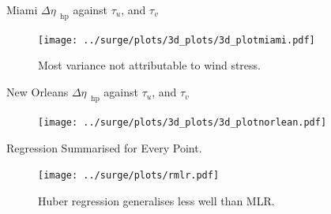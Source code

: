 \documentclass[usenames, dvipsnames]{beamer}
\begin{document}
\begin{frame}{Miami $\Delta\eta_{\;\;\mathrm{hp}}$ against $\tau_u$, and $\tau_v$}
\vspace{-30pt}
\hspace{-30pt}
 \begin{minipage}{1.1\textwidth}

\begin{figure}[htb!]
    \centering
   \hspace{-40pt} \texttt{[image: ../surge/plots/3d\_plots/3d\_plotmiami.pdf]}
    \vspace{-15pt}
    \caption{Most variance not attributable to wind stress.}
    \label{fig:A}
\end{figure}
\end{minipage}
\end{frame}


\begin{frame}{New Orleans $\Delta\eta_{\;\;\mathrm{hp}}$ against $\tau_u$, and $\tau_v$}
\vspace{-30pt}
\hspace{-30pt}
 \begin{minipage}{1.1\textwidth}
\begin{figure}[htb!]
    \centering
   \hspace{-40pt} \texttt{[image: ../surge/plots/3d\_plots/3d\_plotnorlean.pdf]}
    \vspace{-15pt}
    \label{fig:A}
\end{figure}
\end{minipage}
\end{frame}


\begin{frame}{Regression Summarised for Every Point.}
\vspace{-30pt}
\hspace{-30pt}
 \begin{minipage}{1.1\textwidth}
\begin{figure}[htb!]
    \centering
   \hspace{-40pt} \texttt{[image: ../surge/plots/rmlr.pdf]}
    \vspace{-15pt}
   \caption{Huber regression generalises less well than MLR.}
    \label{fig:A}
\end{figure}
\end{minipage}
\end{frame}
\end{document}
